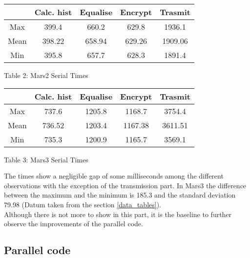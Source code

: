 \documentclass[12pt]{article}
\begin{document}
\vspace{0.5cm}

\begin{center}

\begin{tabular}{|c|c|c|c|c|}
																	\hline
			&Calc. hist	&Equalise	&	Encrypt	&	Trasmit		\\	\hline
	Max		&	399.4	&	660.2	&	629.8	&	1936.1		\\	\hline
	Mean	&	398.22	&	658.94	&	629.26	&	1909.06		\\	\hline
	Min		&	395.8	&	657.7	&	628.3	&	1891.4		\\	\hline
\end{tabular}

\vspace{0.3cm}
Table 2: Mars2 Serial Times
\end{center}

\vspace{0.5cm}

\begin{center}

\begin{tabular}{|c|c|c|c|c|}
																	\hline
			&Calc. hist	&Equalise	&	Encrypt	&	Trasmit		\\	\hline
	Max		&	737.6	&	1205.8	&	1168.7	&	3754.4		\\	\hline
	Mean	&	736.52	&	1203.4	&	1167.38	&	3611.51		\\	\hline
	Min		&	735.3	&	1200.9	&	1165.7	&	3569.1		\\	\hline
\end{tabular}

\vspace{0.3cm}
Table 3: Mars3 Serial Times
\end{center}

\vspace{0.5cm}

The times show a negligible gap of some milliseconds among the different observations with the exception of the transmission part. In Mars3 the difference between the maximum and the minimum is 185.3 and the standard deviation 79.98 (Datum taken from the section \ref{data_tables}).\\


Although there is not more to show in this part, it is the baseline to further observe the improvements of the parallel code.

\subsection{Parallel code}
\end{document}

